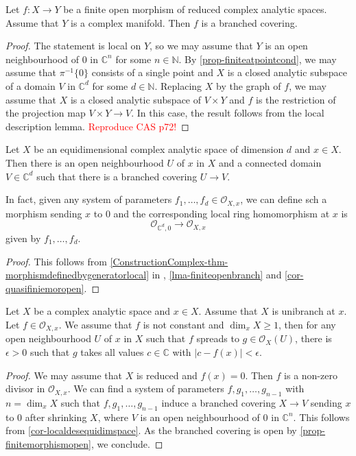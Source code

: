 \begin{lemma}\label{lma-finiteopenbranch}
    Let $f:X\rightarrow Y$ be a finite open morphism of reduced complex analytic spaces. Assume that $Y$ is a complex manifold. Then $f$ is a branched covering.
\end{lemma}
\begin{proof}
    The statement is local on $Y$, so we may assume that $Y$ is an open neighbourhood of $0$ in $\mathbb{C}^n$ for some $n\in \mathbb{N}$. By \cref{prop-finiteatpointcond}, we may assume that $\pi^{-1}\{0\}$ consists of a single point and $X$ is a closed analytic subspace of a domain $V$ in $\mathbb{C}^d$ for some $d\in \mathbb{N}$. Replacing $X$ by the graph of $f$, we may assume that $X$ is a closed analytic subspace of $V\times Y$ and $f$ is the restriction of the projection map $V\times Y\rightarrow V$.  In this case, the result follows from the local description lemma. \textcolor{red}{Reproduce CAS p72!} 
\end{proof}
\begin{corollary}\label{cor-localdesequidimspace}
    Let $X$ be an equidimensional complex analytic space of dimension $d$ and $x\in X$. Then there is an open neighbourhood $U$ of $x$ in $X$ and a connected domain $V\in \mathbb{C}^d$  such that there is a branched covering $U\rightarrow V$.

    In fact, given any system of parameters $f_1,\ldots,f_d\in \mathcal{O}_{X,x}$, we can define sch a morphism sending $x$ to $0$ and the corresponding local ring homomorphism at $x$ is 
    \[
        \mathcal{O}_{\mathbb{C}^d,0}\rightarrow \mathcal{O}_{X,x}  
    \]
    given by $f_1,\ldots,f_d$.
\end{corollary}
\begin{proof}
    This follows from \cref{ConstructionComplex-thm-morphismdefinedbygeneratorlocal} in , \cref{lma-finiteopenbranch} and \cref{cor-quasifiniemoropen}.
\end{proof}

\begin{corollary}\label{cor-takeallvalues}
    Let $X$ be a complex analytic space and $x\in X$. Assume that $X$ is unibranch at $x$. Let $f\in \mathcal{O}_{X,x}$. We assume that $f$ is not constant and $\dim_x X\geq 1$, then for any open neighbourhood $U$ of $x$ in $X$ such that $f$ spreads to $g\in \mathcal{O}_X(U)$, there is $\epsilon>0$ such that $g$ takes all values $c\in \mathbb{C}$ with $|c-f(x)|<\epsilon$.
\end{corollary}
\begin{proof}
    We may assume that $X$ is reduced and $f(x)=0$. Then $f$ is a non-zero divisor in $\mathcal{O}_{X,x}$. We can find a system of parameters $f,g_1,\ldots,g_{n-1}$ with $n=\dim_x X$ such that $f,g_1,\ldots,g_{n-1}$ induce a branched covering $X\rightarrow V$ sending $x$ to $0$ after shrinking $X$, where $V$ is an open neighbourhood of $0$ in $\mathbb{C}^n$. This follows from \cref{cor-localdesequidimspace}. As the branched covering is open by \cref{prop-finitemorphismopen}, we conclude.
\end{proof}

